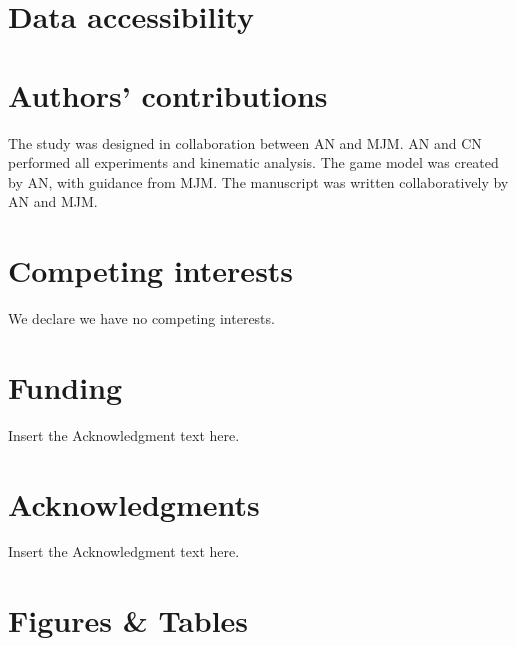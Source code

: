 \documentclass[]{rsos}%
\begin{document}
\section*{Data accessibility}


\section*{Authors' contributions}
The study was designed in collaboration between AN and MJM.
AN and CN performed all experiments and kinematic analysis.
The game model was created by AN, with guidance from MJM. 
The manuscript was written collaboratively by AN and MJM.

\section*{Competing interests}
We declare we have no competing interests.

\section*{Funding}
Insert the Acknowledgment text here.

\section*{Acknowledgments}
Insert the Acknowledgment text here.




\linespread{1}\selectfont %



\pagebreak



\section*{Figures \& Tables}

\end{document}
